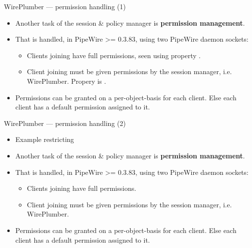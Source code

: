 \begin{frame}{WirePlumber — permission handling (1)}
  \begin{itemize}

  \item Another task of the session \& policy manager is \textbf{permission
    management}.

  \item That is handled, in PipeWire >= 0.3.83, using two PipeWire daemon sockets:

    \begin{itemize}
    \item Clients joining  have full permissions, seen
      using property .
    \item Client joining  must be given permissions by the
      session manager, i.e. WirePlumber. Propery  is
      .
    \end{itemize}

  \item Permissions can be granted on a per-object-basis for each client. Else
    each client has a default permission assigned to it.

  \end{itemize}
\end{frame}



\begin{frame}{WirePlumber — permission handling (2)}
  \begin{itemize}
  \item Example restricting

  \item Another task of the session \& policy manager is \textbf{permission
    management}.

  \item That is handled, in PipeWire >= 0.3.83, using two PipeWire daemon sockets:

    \begin{itemize}
    \item Clients joining  have full permissions.
    \item Client joining  must be given permissions by the
      session manager, i.e. WirePlumber.
    \end{itemize}

  \item Permissions can be granted on a per-object-basis for each client. Else
    each client has a default permission assigned to it.

  \end{itemize}
\end{frame}



